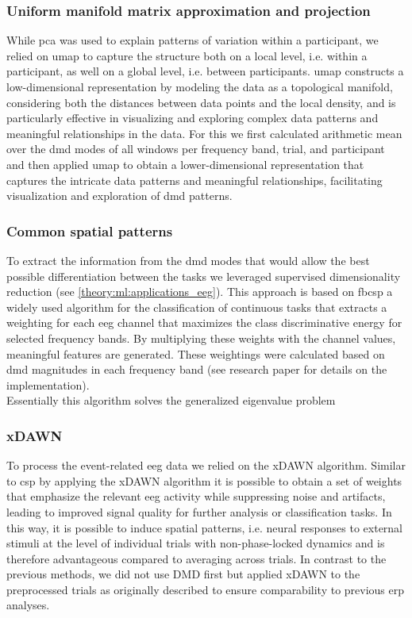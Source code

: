 \subsubsection{Uniform manifold matrix approximation and projection}
While \gls{pca} was used to explain patterns of variation within a participant, we relied on \gls{umap} to capture the structure both on a local level, i.e. within a participant, as well on a global level, i.e. between participants. \Gls{umap} constructs a low-dimensional representation by modeling the data as a topological manifold, considering both the distances between data points and the local density, and is particularly effective in visualizing and exploring complex data patterns and meaningful relationships in the data. For this we first calculated arithmetic mean over the \gls{dmd} modes of all windows per frequency band, trial, and participant and then applied \gls{umap} to obtain a lower-dimensional representation that captures the intricate data patterns and meaningful relationships, facilitating visualization and exploration of \gls{dmd} patterns.

\subsubsection{Common spatial patterns}
To extract the information from the \gls{dmd} modes that would allow the best possible differentiation between the tasks we leveraged supervised dimensionality reduction (see \autoref{theory:ml:applications_eeg}). This approach is based on \gls{fbcsp} a widely used algorithm for the classification of continuous tasks that extracts a weighting for each \gls{eeg} channel that maximizes the class discriminative energy for selected frequency bands. By multiplying these weights with the channel values, meaningful features are generated. These weightings were calculated based on \gls{dmd} magnitudes in each frequency band (see research paper  \cite{Goelz2021a} for details on the implementation).\\
Essentially this algorithm solves the generalized eigenvalue problem 

\subsubsection{xDAWN}
To process the event-related \gls{eeg} data we relied on the xDAWN algorithm. Similar to \gls{csp} by applying the xDAWN algorithm it is possible to obtain a set of weights that emphasize the relevant \gls{eeg} activity while suppressing noise and artifacts, leading to improved signal quality for further analysis or classification tasks. In this way, it is possible to induce spatial patterns, i.e. neural responses to external stimuli at the level of individual trials with non-phase-locked dynamics and is therefore advantageous compared to averaging across trials. In contrast to the previous methods, we did not use DMD first but applied xDAWN to the preprocessed trials as originally described to ensure comparability to previous erp analyses.\\


